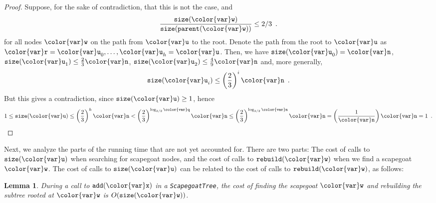 \documentclass[10pt]{book}
\theoremstyle{plain}
\newtheorem{lem}{Lemma}[chapter]
\theoremstyle{definition}
\begin{document}
\begin{proof}
  Suppose, for the sake of contradiction, that this is not the case, and
  \[
     \frac{\ensuremath{\mathtt{size({\color{var}w})}}}{\ensuremath{\mathtt{size(parent({\color{var}w}))}}} \le 2/3 \enspace .
  \]
  for all nodes \ensuremath{\mathtt{{\color{var}w}}} on the path from \ensuremath{\mathtt{{\color{var}u}}} to the root.  Denote the path
  from the root to \ensuremath{\mathtt{{\color{var}u}}} as $\ensuremath{\mathtt{{\color{var}r}}}=\ensuremath{\mathtt{{\color{var}u}}}_0,\ldots,\ensuremath{\mathtt{{\color{var}u}}}_h=\ensuremath{\mathtt{{\color{var}u}}}$.  Then, we have
  $\ensuremath{\mathtt{size({\color{var}u}}}_0\ensuremath{\mathtt{)}}=\ensuremath{\mathtt{{\color{var}n}}}$,
  $\ensuremath{\mathtt{size({\color{var}u}}}_1\ensuremath{\mathtt{)}}\le\frac{2}{3}\ensuremath{\mathtt{{\color{var}n}}}$, 
  $\ensuremath{\mathtt{size({\color{var}u}}}_2\ensuremath{\mathtt{)}}\le\frac{4}{9}\ensuremath{\mathtt{{\color{var}n}}}$ and, more generally,
  \[
  \ensuremath{\mathtt{size({\color{var}u}}}_i\ensuremath{\mathtt{)}}\le\left(\frac{2}{3}\right)^i\ensuremath{\mathtt{{\color{var}n}}} \enspace .
  \]
  But this gives a contradiction, since $\ensuremath{\mathtt{size({\color{var}u})}}\ge 1$, hence
  \[
    1 \le \ensuremath{\mathtt{size({\color{var}u})}} \le \left(\frac{2}{3}\right)^h\ensuremath{\mathtt{{\color{var}n}}}
   < \left(\frac{2}{3}\right)^{\log_{3/2} \ensuremath{\mathtt{{\color{var}q}}}}\ensuremath{\mathtt{{\color{var}n}}}
   \le \left(\frac{2}{3}\right)^{\log_{3/2} \ensuremath{\mathtt{{\color{var}n}}}}\ensuremath{\mathtt{{\color{var}n}}}
   = \left(\frac{1}{\ensuremath{\mathtt{{\color{var}n}}}}\right) \ensuremath{\mathtt{{\color{var}n}}}
   = 1 \enspace . \qedhere
  \]
\end{proof}

Next, we analyze the parts of the running time that are not yet
accounted for.  There are two parts:  The cost of calls to \ensuremath{\mathtt{size({\color{var}u})}}
when searching for scapegoat nodes, and the cost of calls to \ensuremath{\mathtt{rebuild({\color{var}w})}}
when we find a scapegoat \ensuremath{\mathtt{{\color{var}w}}}.  The cost of calls to \ensuremath{\mathtt{size({\color{var}u})}} can be
related to the cost of calls to \ensuremath{\mathtt{rebuild({\color{var}w})}}, as follows:
\begin{lem}
During a call to \ensuremath{\mathtt{add({\color{var}x})}} in a \texttt{ScapegoatTree}, the cost of finding the scapegoat \ensuremath{\mathtt{{\color{var}w}}} and rebuilding the subtree rooted at \ensuremath{\mathtt{{\color{var}w}}} is $O(\ensuremath{\mathtt{size({\color{var}w})}})$.
\end{lem}
\end{document}
